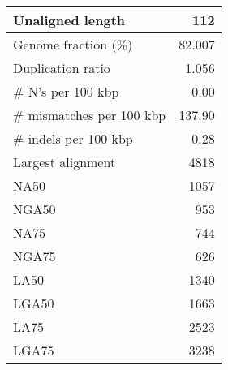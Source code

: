 \documentclass[12pt,a4paper]{article}
\begin{document}
\begin{table}[ht]
\begin{center}
\begin{tabular}{|l*{1}{|r}|}
Unaligned length & 112 \\ \hline
Genome fraction (\%) & 82.007 \\ \hline
Duplication ratio & 1.056 \\ \hline
\# N's per 100 kbp & 0.00 \\ \hline
\# mismatches per 100 kbp & 137.90 \\ \hline
\# indels per 100 kbp & 0.28 \\ \hline
Largest alignment & 4818 \\ \hline
NA50 & 1057 \\ \hline
NGA50 & 953 \\ \hline
NA75 & 744 \\ \hline
NGA75 & 626 \\ \hline
LA50 & 1340 \\ \hline
LGA50 & 1663 \\ \hline
LA75 & 2523 \\ \hline
LGA75 & 3238 \\ \hline
\end{tabular}
\end{center}
\end{table}
\end{document}
